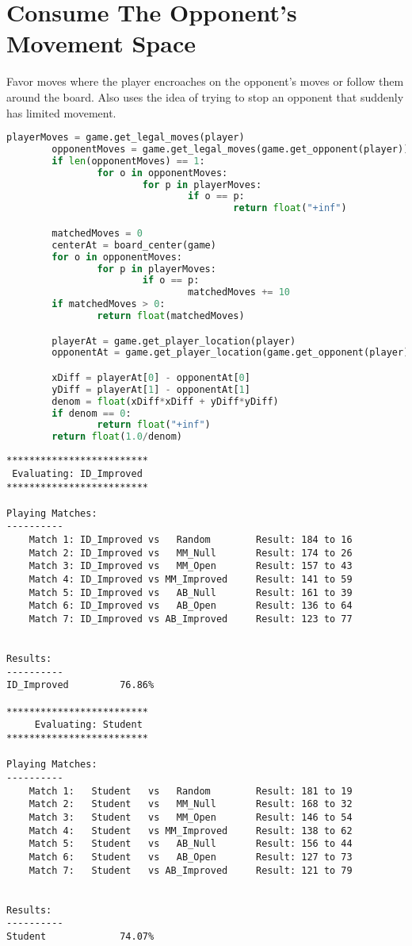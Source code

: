 \documentclass[10pt, a4paper]{article}
\begin{document}
\section{Consume The Opponent's Movement Space}

Favor moves where the player encroaches on the opponent's moves or follow them around
the board. Also uses the idea of trying to stop an opponent that suddenly has limited movement.

\begin{lstlisting}[language=Python]
		playerMoves = game.get_legal_moves(player)
		opponentMoves = game.get_legal_moves(game.get_opponent(player))
		if len(opponentMoves) == 1:
				for o in opponentMoves:
						for p in playerMoves:
								if o == p:
										return float("+inf")

		matchedMoves = 0
		centerAt = board_center(game)
		for o in opponentMoves:
				for p in playerMoves:
						if o == p:
								matchedMoves += 10
		if matchedMoves > 0:
				return float(matchedMoves)

		playerAt = game.get_player_location(player)
		opponentAt = game.get_player_location(game.get_opponent(player))

		xDiff = playerAt[0] - opponentAt[0]
		yDiff = playerAt[1] - opponentAt[1]
		denom = float(xDiff*xDiff + yDiff*yDiff)
		if denom == 0:
				return float("+inf")
		return float(1.0/denom)
\end{lstlisting}

\begin{verbatim}
*************************
 Evaluating: ID_Improved 
*************************

Playing Matches:
----------
	Match 1: ID_Improved vs   Random    	Result: 184 to 16
	Match 2: ID_Improved vs   MM_Null   	Result: 174 to 26
	Match 3: ID_Improved vs   MM_Open   	Result: 157 to 43
	Match 4: ID_Improved vs MM_Improved 	Result: 141 to 59
	Match 5: ID_Improved vs   AB_Null   	Result: 161 to 39
	Match 6: ID_Improved vs   AB_Open   	Result: 136 to 64
	Match 7: ID_Improved vs AB_Improved 	Result: 123 to 77


Results:
----------
ID_Improved         76.86%

*************************
	 Evaluating: Student   
*************************

Playing Matches:
----------
	Match 1:   Student   vs   Random    	Result: 181 to 19
	Match 2:   Student   vs   MM_Null   	Result: 168 to 32
	Match 3:   Student   vs   MM_Open   	Result: 146 to 54
	Match 4:   Student   vs MM_Improved 	Result: 138 to 62
	Match 5:   Student   vs   AB_Null   	Result: 156 to 44
	Match 6:   Student   vs   AB_Open   	Result: 127 to 73
	Match 7:   Student   vs AB_Improved 	Result: 121 to 79


Results:
----------
Student             74.07%
\end{verbatim}
\end{document}
